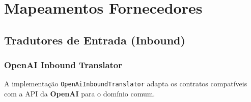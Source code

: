 \chapter{Mapeamentos Fornecedores}
\label{apendice:mapeamentos-fornecedores}

    \section{Tradutores de Entrada (Inbound)}
    \subsection{\textbf{OpenAI} Inbound Translator}

A implementação \texttt{OpenAiInboundTranslator} adapta os contratos compatíveis com a API da \textbf{OpenAI} para o domínio comum.
    
